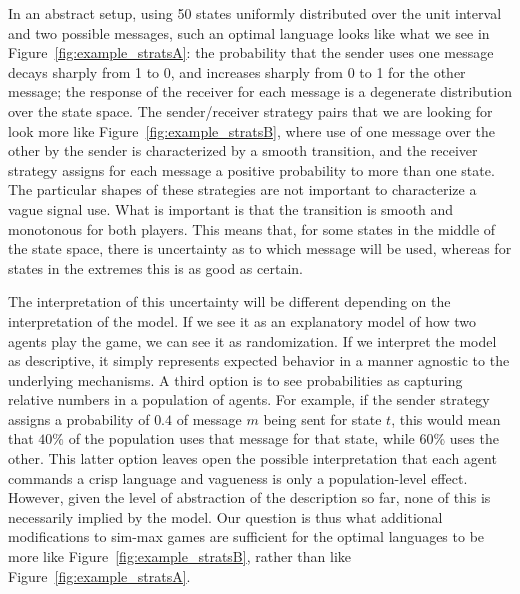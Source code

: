 \documentclass[a4paper]{article}
\begin{document}
In an abstract setup, using 50 states uniformly distributed over the unit interval and two possible messages, such an optimal language looks like what we see in Figure~\ref{fig:example_stratsA}: the probability that the sender uses one message decays sharply from 1 to 0, and increases sharply from 0 to 1 for the other message; the response of the receiver for each message is a degenerate distribution over the state space.
The sender/receiver strategy pairs that we are looking for look more like Figure~\ref{fig:example_stratsB}, where use of one message over the other by the sender is characterized by a smooth transition, and the receiver strategy assigns for each message a positive probability to more than one state.
The particular shapes of these strategies are not important to characterize a vague signal use.
What is important is that the transition is smooth and monotonous for both players.
This means that, for some states in the middle of the state space, there is uncertainty as to which message will be used, whereas for states in the extremes this is as good as certain.

The interpretation of this uncertainty will be different depending on the interpretation of the model.
If we see it as an explanatory model of how two agents play the game, we can see it as randomization.
If we interpret the model as descriptive, it simply represents expected behavior in a manner agnostic to the underlying mechanisms.
A third option is to see probabilities as capturing relative numbers in a population of agents.
For example, if the sender strategy assigns a probability of $0.4$ of message $m$ being sent for state $t$, this would mean that $40\%$ of the population uses that message for that state, while $60\%$ uses the other.
This latter option leaves open the possible interpretation that each agent commands a crisp language and vagueness is only a population-level effect.
However, given the level of abstraction of the description so far, none of this is necessarily implied by the model.
Our question is thus what additional modifications to sim-max games are sufficient for the optimal languages to be more like Figure~\ref{fig:example_stratsB}, rather than like Figure~\ref{fig:example_stratsA}.
\end{document}
